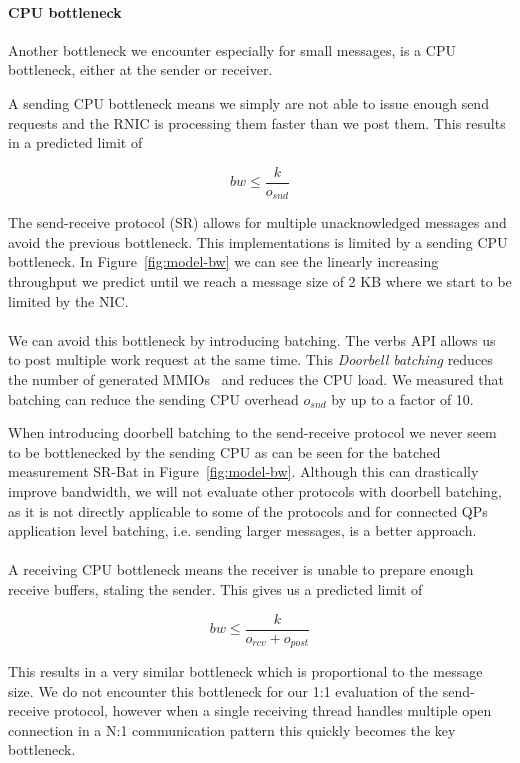 \paragraph{CPU bottleneck} Another bottleneck we encounter especially for small messages, is a CPU bottleneck, either at the 
sender or receiver.

A sending CPU bottleneck means we simply are not able to issue enough send requests and the RNIC is processing them faster
than we post them. This results in a predicted limit of

$$
bw \leq \frac{k}{o_{snd}}
$$


The send-receive protocol (SR) allows for multiple unacknowledged messages and avoid the previous bottleneck. 
This implementations is limited by a sending CPU bottleneck. In Figure~\ref{fig:model-bw} we can see the linearly
increasing throughput we predict until we reach a message size of 2 KB where we start to be limited by the NIC.

\paragraph{} We can avoid this bottleneck by introducing batching. The verbs API allows us to post multiple work request at 
the same time. This \emph{Doorbell batching} reduces the number of generated MMIOs~\cite{anuj-guide} and reduces the CPU load.
We measured that batching can reduce the sending CPU overhead $o_{snd}$ by up to a factor of 10. 

When introducing doorbell batching to the send-receive protocol we never seem to be bottlenecked by the sending CPU as 
can be seen for the batched measurement SR-Bat in Figure~\ref{fig:model-bw}.
Although this can drastically improve bandwidth, we will not evaluate other protocols with doorbell batching, as it is
not directly applicable to some of the protocols and for connected QPs application level batching, i.e. sending larger 
messages, is a better approach.

\paragraph{} A receiving CPU bottleneck means the receiver is unable to prepare enough receive buffers, staling the sender. 
This gives us a predicted limit of

$$
bw \leq \frac{k}{o_{rcv} + o_{post}}
$$

This results in a very similar bottleneck which is proportional to the message size. We do not encounter this bottleneck for
our 1:1 evaluation of the send-receive protocol, however when a single receiving thread handles multiple open connection 
in a N:1 communication pattern this quickly becomes the key bottleneck.

